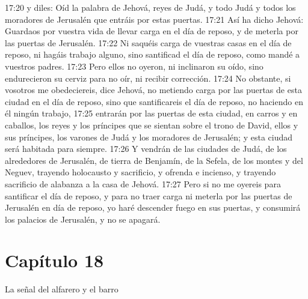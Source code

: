 17:20 y diles: Oíd la palabra de Jehová, reyes de Judá, y todo Judá y todos los moradores de Jerusalén que entráis por estas puertas. 
17:21 Así ha dicho Jehová: Guardaos por vuestra vida de llevar carga en el día de reposo, y de meterla por las puertas de Jerusalén. 
17:22 Ni saquéis carga de vuestras casas en el día de reposo, ni hagáis trabajo alguno, sino santificad el día de reposo, como mandé a vuestros padres. 
17:23 Pero ellos no oyeron, ni inclinaron su oído, sino endurecieron su cerviz para no oír, ni recibir corrección. 
17:24 No obstante, si vosotros me obedeciereis, dice Jehová, no metiendo carga por las puertas de esta ciudad en el día de reposo, sino que santificareis el día de reposo, no haciendo en él ningún trabajo, 
17:25 entrarán por las puertas de esta ciudad, en carros y en caballos, los reyes y los príncipes que se sientan sobre el trono de David, ellos y sus príncipes, los varones de Judá y los moradores de Jerusalén; y esta ciudad será habitada para siempre. 
17:26 Y vendrán de las ciudades de Judá, de los alrededores de Jerusalén, de tierra de Benjamín, de la Sefela, de los montes y del Neguev, trayendo holocausto y sacrificio, y ofrenda e incienso, y trayendo sacrificio de alabanza a la casa de Jehová. 
17:27 Pero si no me oyereis para santificar el día de reposo, y para no traer carga ni meterla por las puertas de Jerusalén en día de reposo, yo haré descender fuego en sus puertas, y consumirá los palacios de Jerusalén, y no se apagará. 

\section*{Capítulo 18}
La señal del alfarero y el barro 
 
